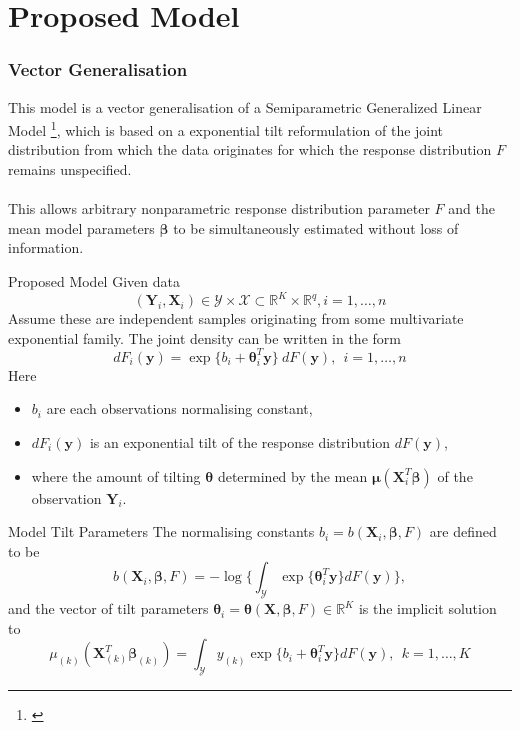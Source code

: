 \documentclass[9pt,notes=hide]{beamer}
\newcommand{\vect}[1]{\boldsymbol #1}
\newcommand{\by}{\vect{y}}
\newcommand{\R}{\mathbb R}
\newcommand{\vbe}{\vect{\beta}}
\newcommand{\X}{\vect{X}}
\newcommand{\Y}{\vect{Y}}
\begin{document}
\section{Proposed Model}


\begin{frame}
	\frametitle{Vector Generalisation}
	This model is a vector generalisation of a Semiparametric  Generalized Linear
	Model \footnote{\parencite{Rathouz2009, Huang2012, Huang2014}}, which is
	based on a exponential tilt reformulation of the joint distribution from
	which the data originates for which  the response distribution $F$  remains
	unspecified. \\
	\pause
	\vspace{0.1cm}\\

	This allows  arbitrary nonparametric response distribution parameter $F$ and
	the  mean model parameters $\vbe$ to be simultaneously estimated without
	loss of information.

\end{frame}


\begin{frame}{Proposed Model}
	Given data
	\[
		(\Y_i, \X_i) \in \mathcal{Y} \times \mathcal{X} \subset \R^K \times \R^q, i = 1,\dots, n
	\]
	\pause
	Assume these are independent samples originating from some multivariate exponential family.
	The joint density can be written in the form
	\begin{equation*}\label{eq:referencDistribution}
		dF_i(\by) = \exp\{b_i + \vect{\theta}_i^T\by \}  \ dF(\by),  \  \ i = 1,\dots, n
	\end{equation*}
	\pause
	Here
	\pause
	\begin{itemize}[<+->]
		\item $b_i$ are each observations normalising constant,
		\item  $dF_i(\by)$ is an exponential tilt of the response distribution $dF(\by)$,
		\item  where the amount of tilting $\vect{\theta}$ determined by the mean
		      $\vect{\mu}(\X_i^T\vbe)$ of the observation $\Y_i$.
	\end{itemize}
\end{frame}

\begin{frame}{Model Tilt Parameters}
	The normalising constants $b_i = b(\X_i, \vbe,F)$ are defined to be
	\begin{equation*}\label{eq:normalisationConstraint}
		b(\X_i, \vbe, F) = -\log \Bigg\{\int_{\mathcal{Y}} \exp\{\vect{\theta}_i^T\by \}dF(\by) \Bigg\},
	\end{equation*}
	\pause
	and the vector of tilt parameters $\vect{\theta}_i = \vect{\theta}(\X, \vbe, F) \in \R^K$ is the implicit solution to
	\begin{equation*}\label{eq:MeanConstraint}
		\mu_{(k)}(\X_{(k)}^T\vbe_{(k)}) = \int_{\mathcal{Y}}y_{(k)}\exp\{b_i + \vect{\theta}_i^T\by \}dF(\by),  \  \ k = 1,\dots,K
	\end{equation*}
\end{frame}
\end{document}
